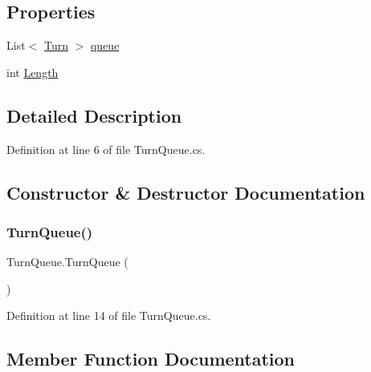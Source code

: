 \subsection*{Properties}
\begin{DoxyCompactItemize}
\item 
List$<$ \mbox{\hyperlink{class_turn}{Turn}} $>$ \mbox{\hyperlink{class_turn_queue_a55c5122a7e3ce31ec8b79e9feb14bd27}{queue}}
\item 
int \mbox{\hyperlink{class_turn_queue_ac5d7ed68bb4f7c1b6e93f55da966a7b3}{Length}}
\end{DoxyCompactItemize}


\subsection{Detailed Description}


Definition at line 6 of file Turn\+Queue.\+cs.



\subsection{Constructor \& Destructor Documentation}
\mbox{\label{class_turn_queue_a15bbf8315c0dc5ad3d211872f3de296b}} 
\subsubsection{\texorpdfstring{TurnQueue()}{TurnQueue()}}
{\footnotesize\ttfamily Turn\+Queue.\+Turn\+Queue (\begin{DoxyParamCaption}{ }\end{DoxyParamCaption})}



Definition at line 14 of file Turn\+Queue.\+cs.



\subsection{Member Function Documentation}
\mbox{\label{class_turn_queue_aa677cc3ae9812e45a5b7e8932c199e27}} 
